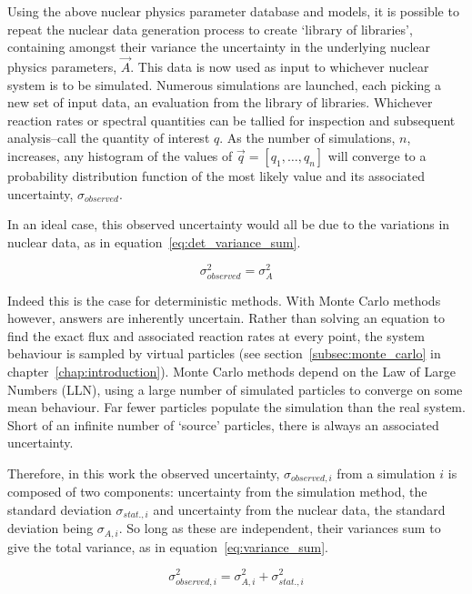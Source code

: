Using the above nuclear physics parameter database and models, it is possible to repeat the nuclear data generation process to create `library of libraries', containing amongst their variance the uncertainty in the underlying nuclear physics parameters, $\vec{A}$. This data is now used as input to whichever nuclear system is to be simulated. Numerous simulations are launched, each picking a new set of input data, an evaluation from the library of libraries. Whichever reaction rates or spectral quantities can be tallied for inspection and subsequent analysis--call the quantity of interest $q$. As the number of simulations, $n$, increases, any histogram of the values of $\vec{q} = [q_{1},\ldots,q_{n}]$ will converge to a probability distribution function of the most likely value and its associated uncertainty, $\sigma_{observed}$. 

In an ideal case, this observed uncertainty would all be due to the variations in nuclear data, as in equation~\ref{eq:det_variance_sum}.

\begin{equation}
  \label{eq:det_variance_sum}
  \sigma_{observed}^{2} = \sigma_{A}^{2} 
\end{equation}

Indeed this is the case for deterministic methods. With Monte Carlo methods however, answers are inherently uncertain. Rather than solving an equation to find the exact flux and associated reaction rates at every point, the system behaviour is sampled by virtual particles (see section~\ref{subsec:monte_carlo} in chapter~\ref{chap:introduction}). Monte Carlo methods depend on the Law of Large Numbers (LLN), using a large number of simulated particles to converge on some mean behaviour. Far fewer particles populate the simulation than the real system. Short of an infinite number of `source' particles, there is always an associated uncertainty. 

Therefore, in this work the observed uncertainty, $\sigma_{observed,i}$ from a simulation $i$ is composed of two components: uncertainty from the simulation method, the standard deviation $\sigma_{stat.,i}$ and uncertainty from the nuclear data, the standard deviation being $\sigma_{A,i}$. So long as these are independent, their variances sum to give the total variance, as in equation~\ref{eq:variance_sum}.

\begin{equation}
  \label{eq:variance_sum}
  \sigma_{observed,i}^{2} = \sigma_{A,i}^{2} + \sigma_{stat.,i}^{2}
\end{equation}

